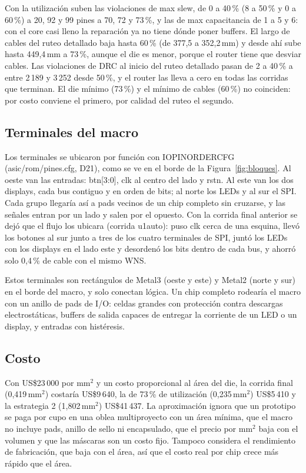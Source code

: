 \documentclass[11pt,a4paper]{article}
\DeclareRobustCommand{\sig}[1]{{\ttfamily\def\_{\textunderscore\allowbreak}#1}}
\newcommand{\mmd}{\,mm$^2$\xspace}
\begin{document}
Con la utilización suben las violaciones de max slew, de 0 a 40\,\% (8 a 50\,\% y 0 a 60\,\%) a 20, 92 y 99 pines a 70, 72 y 73\,\%, y las de max capacitancia de 1 a 5 y 6: con el core casi lleno la reparación ya no tiene dónde poner buffers. El largo de cables del ruteo detallado baja hasta 60\,\% (de 377,5 a 352,2\,mm) y desde ahí sube hasta 449,4\,mm a 73\,\%, aunque el die es menor, porque el router tiene que desviar cables. Las violaciones de DRC al inicio del ruteo detallado pasan de 2 a 40\,\% a entre 2\,189 y 3\,252 desde 50\,\%, y el router las lleva a cero en todas las corridas que terminan. El die mínimo (73\,\%) y el mínimo de cables (60\,\%) no coinciden: por costo conviene el primero, por calidad del ruteo el segundo.

\subsection{Terminales del macro}

Los terminales se ubicaron por función con \sig{IO\_PIN\_ORDER\_CFG} (\sig{asic/rom/pines.cfg}, D21), como se ve en el borde de la Figura~\ref{fig:bloques}. Al oeste van las entradas: \sig{btn[3:0]}, \sig{clk} al centro del lado y \sig{rst\_n}. Al este van los dos displays, cada bus contiguo y en orden de bits; al norte los LEDs y al sur el SPI. Cada grupo llegaría así a pads vecinos de un chip completo sin cruzarse, y las señales entran por un lado y salen por el opuesto. Con la corrida final anterior se dejó que el flujo los ubicara (corrida \sig{u1\_auto}): puso \sig{clk} cerca de una esquina, llevó los botones al sur junto a tres de los cuatro terminales de SPI, juntó los LEDs con los displays en el lado este y desordenó los bits dentro de cada bus, y ahorró solo 0,4\,\% de cable con el mismo WNS.

Estos terminales son rectángulos de Metal3 (oeste y este) y Metal2 (norte y sur) en el borde del macro, y solo conectan lógica. Un chip completo rodearía el macro con un anillo de pads de I/O: celdas grandes con protección contra descargas electrostáticas, buffers de salida capaces de entregar la corriente de un LED o un display, y entradas con histéresis.

\subsection{Costo}
\label{sec:costo}

Con US\$23\,000 por mm$^2$ y un costo proporcional al área del die, la corrida final (0,419\mmd) costaría US\$9\,640, la de 73\,\% de utilización (0,235\mmd) US\$5\,410 y la estrategia 2 (1,802\mmd) US\$41\,437. La aproximación ignora que un prototipo se paga por cupo en una oblea multiproyecto con un área mínima, que el macro no incluye pads, anillo de sello ni encapsulado, que el precio por mm$^2$ baja con el volumen y que las máscaras son un costo fijo. Tampoco considera el rendimiento de fabricación, que baja con el área, así que el costo real por chip crece más rápido que el área.
\end{document}
